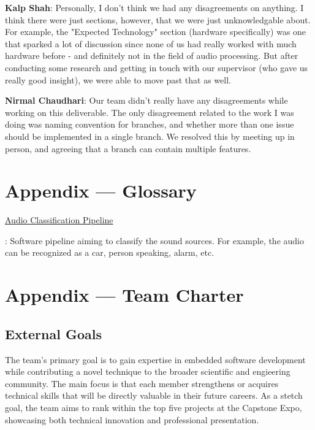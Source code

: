 \documentclass{article}
\begin{document}
\begin{enumerate}
    \textbf{Kalp Shah}: Personally, I don't think we had any disagreements on anything. I think there were just sections, however, that we were just
    unknowledgable about. For example, the "Expected Technology" section (hardware specifically) was one that sparked a lot of discussion since none
    of us had really worked with much hardware before - and definitely not in the field of audio processing. But after conducting some research
    and getting in touch with our supervisor (who gave us really good insight), we were able to move past that as well. 
    
    \textbf{Nirmal Chaudhari}: Our team didn't really have any disagreements while working on this deliverable. 
    The only disagreement related to the work I was doing was naming convention for branches, and whether more than one issue should be implemented in a single branch. 
    We resolved this by meeting up in person, and agreeing that a branch can contain multiple features. 
\end{enumerate}

\newpage{}

\section*{Appendix --- Glossary}


\hypertarget{audio_classification_pipeline}{\underline{Audio Classification Pipeline}}: 
Software pipeline aiming to classify the sound sources.
For example, the audio can be recognized as a car, person speaking, alarm, etc.

\newpage{}

\section*{Appendix --- Team Charter}

\subsection*{External Goals}

The team's primary goal is to gain expertise in embedded software development while contributing a novel technique to the broader scientific and engieering community.
The main focus is that each member strengthens or acquires technical skills that will be directly valuable in their future careers.
As a stetch goal, the team aims to rank within the top five projects at the Capstone Expo, showcasing both technical innovation and professional presentation.
\end{document}
